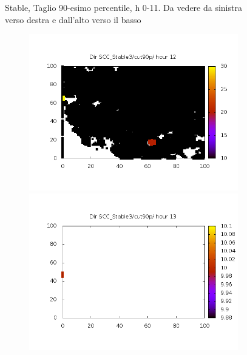 \documentclass[10pt,a4paper]{article}
\begin{document}
\begin{figure}
\begin{subfigure}[b]{1\textwidth}
\end{subfigure}
\caption{Stable, Taglio 90-esimo percentile, h 0-11. Da vedere da sinistra verso destra e dall'alto verso il basso}
\label{cut901}
\end{figure}

\begin{figure}
\centering

\begin{subfigure}[b]{1\textwidth}
\includegraphics[scale=.20]{./img/SCC_Stable3/cut90p/12.png}
\includegraphics[scale=.20]{./img/SCC_Stable3/cut90p/13.png}

\end{subfigure}
\end{figure}
\end{document}
